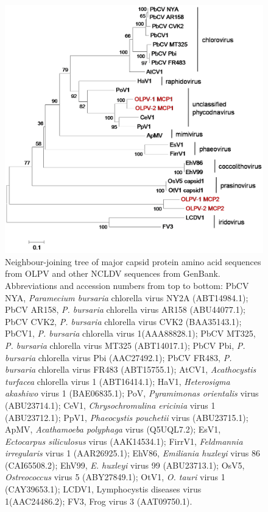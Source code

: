 \begin{figure}
\includegraphics[width=\textwidth]{olv_figures/OLPV_full_mcp.jpg}
\caption[Phylogeny of \ac{OLPV} major capsid sequences]{Neighbour-joining tree of major capsid protein amino acid sequences from \ac{OLPV} and  other \ac{NCLDV} sequences from GenBank. 
Abbreviations and accession numbers from top to bottom: PbCV NYA, \emph{Paramecium bursaria} chlorella virus NY2A (ABT14984.1); PbCV AR158, \emph{P. bursaria} chlorella virus AR158 (ABU44077.1); PbCV CVK2, \emph{P. bursaria} chlorella virus CVK2 (BAA35143.1); PbCV1, \emph{P. bursaria} chlorella virus 1(AAA88828.1); PbCV MT325, \emph{P. bursaria} chlorella virus MT325 (ABT14017.1); PbCV Pbi, \emph{P. bursaria} chlorella virus Pbi (AAC27492.1); PbCV FR483, \emph{P. bursaria} chlorella virus FR483 (ABT15755.1); AtCV1, \emph{Acathocystis turfacea} chlorella virus 1 (ABT16414.1); HaV1, \emph{Heterosigma akashiwo} virus 1 (BAE06835.1); PoV, \emph{Pyramimonas orientalis} virus (ABU23714.1); CeV1, \emph{Chrysochromulina ericinia} virus 1 (ABU23712.1); PpV1, \emph{Phaeocystis pouchetii} virus (ABU23715.1); ApMV, \emph{Acathamoeba polyphaga} virus (Q5UQL7.2); EsV1, \emph{Ectocarpus siliculosus} virus (AAK14534.1); FirrV1, \emph{Feldmannia irregularis} virus 1 (AAR26925.1); EhV86, \emph{Emiliania huxleyi} virus 86 (CAI65508.2); EhV99, \emph{E. huxleyi} virus 99 (ABU23713.1); OsV5, \emph{Ostreococcus} virus 5 (ABY27849.1); OtV1, \emph{O. tauri} virus 1 (CAY39653.1); LCDV1, Lymphocystis diseases virus 1(AAC24486.2); FV3, Frog virus 3 (AAT09750.1). 
}
\label{fig:OLPV_full_mcp}

\end{figure}
